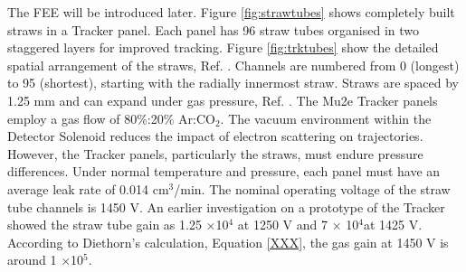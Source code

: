The FEE will be introduced later. Figure \ref{fig:strawtubes} shows completely built straws in a Tracker panel. 
Each panel has 96 straw tubes organised in two staggered layers for improved tracking. Figure \ref{fig:trktubes} 
show the detailed spatial arrangement of the straws, Ref. \cite{trk}. Channels are numbered from 0 (longest) 
to 95 (shortest), starting with the radially innermost straw.
Straws are spaced by 1.25 mm and can expand under gas pressure, Ref. \cite{bartoszek2015mu2e}.
The Mu2e Tracker panels employ a gas flow of 80\%:20\% Ar:CO$_2$. 
The vacuum environment within the Detector Solenoid reduces the impact of electron scattering on trajectories. 
However, the Tracker panels, particularly the straws, must endure pressure differences. Under normal temperature 
and pressure, each panel must have an average leak rate of 0.014 cm$^3$/min. The nominal operating voltage of 
the straw tube channels is 1450 V. An earlier investigation on a prototype of the Tracker showed the straw tube 
gain as 1.25 $\times$10$^4$ at 1250 V and 7 $\times$ 10$^4$at 1425 V. According to Diethorn's calculation, Equation \ref{XXX}, 
the gas gain at 1450 V is around 1 $\times$10$^5$.

